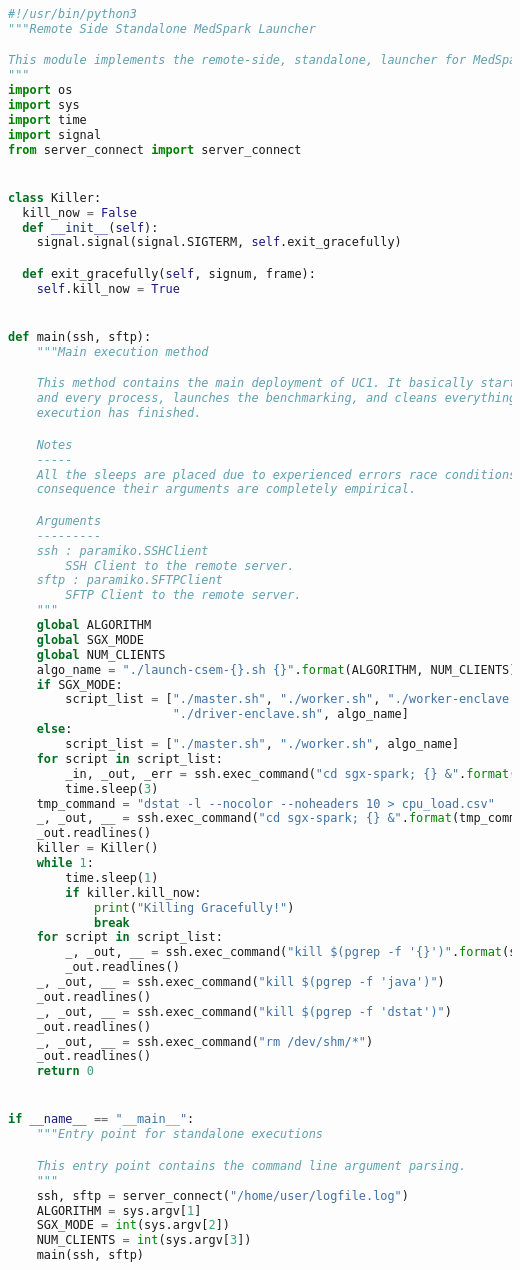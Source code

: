 \begin{lstlisting}[language=Python,caption={Server-Side Deployment Script.},label=code:deployment:server]
#!/usr/bin/python3
"""Remote Side Standalone MedSpark Launcher

This module implements the remote-side, standalone, launcher for MedSpark.
"""
import os
import sys
import time
import signal
from server_connect import server_connect


class Killer:
  kill_now = False
  def __init__(self):
    signal.signal(signal.SIGTERM, self.exit_gracefully)

  def exit_gracefully(self, signum, frame):
    self.kill_now = True


def main(ssh, sftp):
    """Main execution method

    This method contains the main deployment of UC1. It basically starts each
    and every process, launches the benchmarking, and cleans everything when
    execution has finished.

    Notes
    -----
    All the sleeps are placed due to experienced errors race conditions. As a
    consequence their arguments are completely empirical.

    Arguments
    ---------
    ssh : paramiko.SSHClient
        SSH Client to the remote server.
    sftp : paramiko.SFTPClient
        SFTP Client to the remote server.
    """
    global ALGORITHM
    global SGX_MODE
    global NUM_CLIENTS
    algo_name = "./launch-csem-{}.sh {}".format(ALGORITHM, NUM_CLIENTS)
    if SGX_MODE:
        script_list = ["./master.sh", "./worker.sh", "./worker-enclave.sh",
                       "./driver-enclave.sh", algo_name]
    else:
        script_list = ["./master.sh", "./worker.sh", algo_name]
    for script in script_list:
        _in, _out, _err = ssh.exec_command("cd sgx-spark; {} &".format(script))
        time.sleep(3)
    tmp_command = "dstat -l --nocolor --noheaders 10 > cpu_load.csv"
    _, _out, __ = ssh.exec_command("cd sgx-spark; {} &".format(tmp_command))
    _out.readlines()
    killer = Killer()
    while 1:
        time.sleep(1)
        if killer.kill_now:
            print("Killing Gracefully!")
            break
    for script in script_list:
        _, _out, __ = ssh.exec_command("kill $(pgrep -f '{}')".format(script))
        _out.readlines()
    _, _out, __ = ssh.exec_command("kill $(pgrep -f 'java')")
    _out.readlines()
    _, _out, __ = ssh.exec_command("kill $(pgrep -f 'dstat')")
    _out.readlines()
    _, _out, __ = ssh.exec_command("rm /dev/shm/*")
    _out.readlines()
    return 0


if __name__ == "__main__":
    """Entry point for standalone executions

    This entry point contains the command line argument parsing.
    """
    ssh, sftp = server_connect("/home/user/logfile.log")
    ALGORITHM = sys.argv[1]
    SGX_MODE = int(sys.argv[2])
    NUM_CLIENTS = int(sys.argv[3])
    main(ssh, sftp)
\end{lstlisting}

